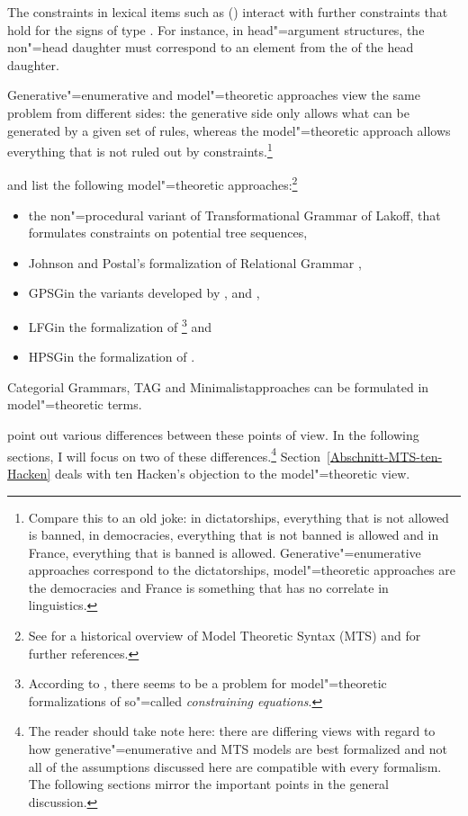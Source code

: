 The constraints in lexical items such as () interact with further constraints that hold for the signs of type
. For instance, in head"=argument structures, the non"=head daughter must correspond to an element from the \subcatl of
the head daughter.
 
Generative"=enumerative and model"=theoretic approaches view the same problem from different sides: the generative side only
allows what can be generated by a given set of rules, whereas the model"=theoretic approach allows everything that is not ruled out
by constraints.\footnote{
Compare this to an old joke: in dictatorships, everything that is not allowed is banned, in democracies, everything
that is not banned is allowed and in France, everything that is banned is allowed. Generative"=enumerative approaches correspond
to the dictatorships, model"=theoretic approaches are the democracies and France is something that has no correlate in linguistics.
}

\citet[--20]{PS2001a} and \citet{Pullum2007a} list the following model"=theoretic approaches:\footnote{
  See  for a historical overview of Model Theoretic Syntax (MTS) and for further references.
}
\begin{itemize}
\item the non"=procedural variant of Transformational Grammar of Lakoff, that formulates
constraints on potential tree sequences,
\item Johnson and Postal's formalization of Relational Grammar \citeyearpar{JP80a-u}, 
\item GPSG\indexgpsg in the variants developed by \citet{GPCKHL88a}, \citet{BGM93a-u} and \citet{Rogers97a},
\item LFG\indexlfg in the formalization of \citet{Kaplan95a}\footnote{
  According to \citet[Section~3.2]{Pullum2013a}, there seems to be a problem for model"=theoretic formalizations of so"=called
  \emph{constraining equations}.
} and   
\item HPSG\indexhpsg in the formalization of \citet{King99a-u}.
\end{itemize}
Categorial Grammars\indexcg \citep{BvN94a-u}, TAG\indextag \citep{RVS94a-u} and
Minimalist\indexmp approaches \citep{Veenstra98a} can be formulated in model"=theoretic terms.

\citet{PS2001a} point out various differences between these points of view. In the following sections, I will focus on two of these differences.\footnote{
	The reader should take note here: there are differing views with regard to how generative"=enumerative and MTS models are best formalized and not
	all of the assumptions discussed here are compatible with every formalism. The following sections mirror the important points in the general discussion.%
} Section~\ref{Abschnitt-MTS-ten-Hacken} deals with ten Hacken's objection to the model"=theoretic view.

